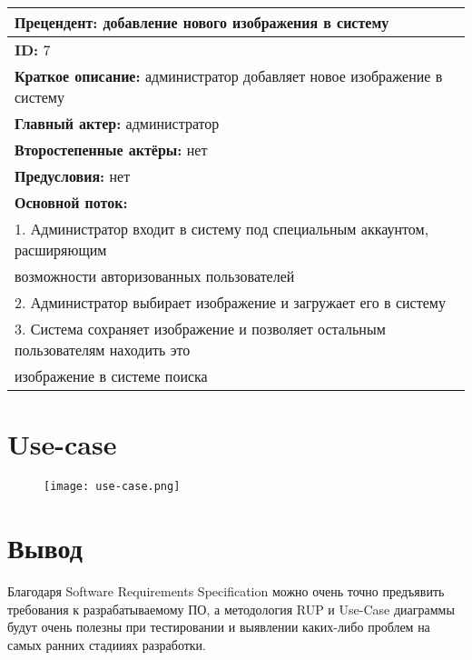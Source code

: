 \documentclass[12pt]{article}
\begin{document}
\begin{table}[H]
\begin{tabular}{|l|}
    \hline
    \textbf{Прецендент:} добавление нового изображения в систему \\
    \hline
    \textbf{ID:} 7 \\
    \hline
    \textbf{Краткое описание:} администратор добавляет новое изображение в систему \\
    \hline
    \textbf{Главный актер:} администратор \\
    \hline
    \textbf{Второстепенные актёры:} нет \\
    \hline
    \textbf{Предусловия:} нет \\
    \hline 
    \textbf{Основной поток:} \\
    1. Администратор входит в систему под специальным аккаунтом, расширяющим \\ возможности 
    авторизованных пользователей \\
    2. Администратор выбирает изображение и загружает его в систему \\
    3. Система сохраняет изображение и позволяет остальным пользователям находить это \\ 
    изображение в системе поиска \\
    \hline
\end{tabular}
\end{table}

\section{Use-case}


\begin{figure}[H]
  \centering
  \texttt{[image: use-case.png]}
\end{figure}

\section*{Вывод}
Благодаря Software Requirements Specification можно очень точно предъявить требования к разрабатываемому ПО, а методология RUP и Use-Case диаграммы будут очень полезны при тестировании и выявлении каких-либо проблем на самых ранних стадииях разработки.
\end{document}
